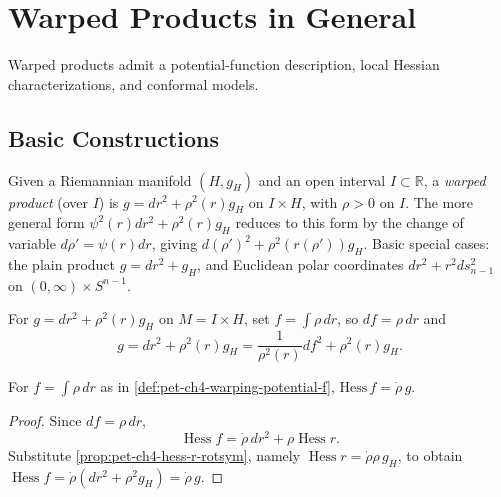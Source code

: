 \section{Warped Products in General}

Warped products admit a potential-function description, local Hessian
characterizations, and conformal models.

\subsection{Basic Constructions}

\begin{definition}
  \label{def:pet-ch4-warped-product-general}
  \leanok
  Given a Riemannian manifold $(H,g_H)$ and an open interval $I\subset\mathbb{R}$, a
  \emph{warped product} (over $I$) is $g=dr^2+\rho^2(r)g_H$ on $I\times H$, with
  $\rho>0$ on $I$. The more general form $\psi^2(r)dr^2+\rho^2(r)g_H$ reduces to
  this form by the change of variable $d\rho'=\psi(r)dr$, giving
  $d(\rho')^2+\rho^2(r(\rho'))g_H$. Basic special cases: the plain product
  $g=dr^2+g_H$, and Euclidean polar coordinates $dr^2+r^2ds_{n-1}^2$ on
  $(0,\infty)\times S^{n-1}$.
\end{definition}

\begin{definition}
  \label{def:pet-ch4-warping-potential-f}
  \leanok
  For $g=dr^2+\rho^2(r)g_H$ on $M=I\times H$, set $f=\int\rho\,dr$, so $df=\rho\,dr$
  and
  \[
    g=dr^2+\rho^2(r)g_H=\frac1{\rho^2(r)}df^2+\rho^2(r)g_H.
  \]
\end{definition}

\begin{proposition}
  \label{prop:pet-ch4-hess-f-conformal}
  For $f=\int\rho\,dr$ as in \cref{def:pet-ch4-warping-potential-f},
  $\mathrm{Hess}\,f=\dot\rho\,g$.
\end{proposition}
\begin{proof}
  \sketch
  Since $df=\rho\,dr$,
  \[
    \operatorname{Hess}f=\dot\rho\,dr^2+\rho\operatorname{Hess}r.
  \]
  Substitute \cref{prop:pet-ch4-hess-r-rotsym}, namely
  $\operatorname{Hess}r=\dot\rho\rho\,g_H$, to obtain
  $\operatorname{Hess}f=\dot\rho(dr^2+\rho^2g_H)=\dot\rho\,g$.
\end{proof}

